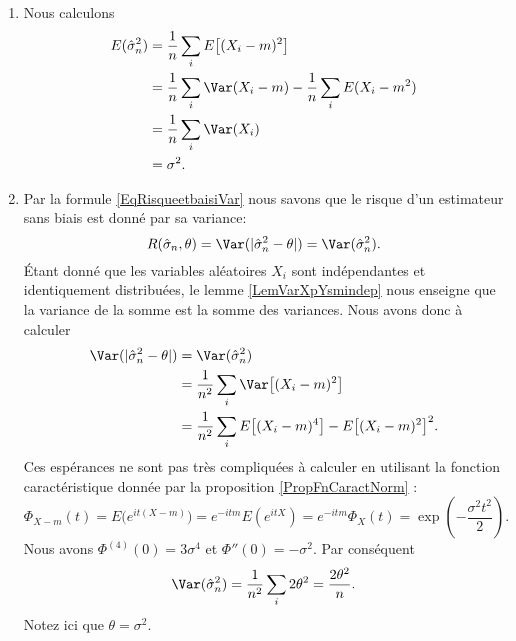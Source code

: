 \begin{example}
	\begin{enumerate}
		\item
		      Nous calculons
		      \begin{equation}
			      \begin{aligned}[]
				      E(\hat\sigma_n^2) & =\frac{1}{ n }\sum_i E\big[ (X_i-m)^2 \big]                   \\
				                        & =\frac{1}{ n }\sum_i\Var(X_i-m)-\frac{1}{ n }\sum_iE(X_i-m^2) \\
				                        & =\frac{1}{ n }\sum_i\Var(X_i)                                 \\
				                        & =\sigma^2.
			      \end{aligned}
		      \end{equation}
		\item
		      Par la formule \eqref{EqRisqueetbaisiVar} nous savons que le risque d'un estimateur sans biais est donné par sa variance:
		      \begin{equation}
			      R(\hat\sigma_n,\theta)=\Var(| \hat\sigma_n^2-\theta |)=\Var(\hat\sigma_n^2).
		      \end{equation}
		      Étant donné que les variables aléatoires \( X_i\) sont indépendantes et identiquement distribuées, le lemme \ref{LemVarXpYsmindep} nous enseigne que la variance de la somme est la somme des variances. Nous avons donc à calculer
		      \begin{equation}
			      \begin{aligned}[]
				      \Var(| \hat\sigma_n^2-\theta |) & =\Var(\hat\sigma_n^2)                                                   \\
				                                      & =\frac{1}{ n^2 }\sum_i\Var\big[ (X_i-m)^2 \big]                         \\
				                                      & =\frac{1}{ n^2 }\sum_i E\big[ (X_i-m)^4 \big]-E\big[ (X_i-m)^2 \big]^2.
			      \end{aligned}
		      \end{equation}
		      Ces espérances ne sont pas très compliquées à calculer en utilisant la fonction caractéristique donnée par la proposition \ref{PropFnCaractNorm} :
		      \begin{equation}
			      \Phi_{X-m}(t)= E\big(  e^{it(X-m)} \big)= e^{-itm}E( e^{itX})= e^{-itm}\Phi_X(t)= \exp\left( -\frac{ \sigma^2t^2 }{2} \right).
		      \end{equation}
		      Nous avons \( \Phi^{(4)}(0)=3\sigma^4\) et \( \Phi''(0)=-\sigma^2\). Par conséquent
		      \begin{equation}
			      \Var(\hat\sigma_n^2)=\frac{1}{ n^2 }\sum_i2\theta^2=\frac{ 2\theta^2 }{ n }.
		      \end{equation}
		      Notez ici que \( \theta=\sigma^2\).


\end{enumerate}
\end{example}
